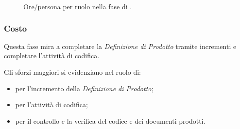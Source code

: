 
\begin{figure}[H]
\caption{Ore/persona per ruolo nella fase di \PDC.}
\label{fig:pdc2}

\end{figure}

\pagebreak
\subsubsection{Costo \PDC}
\introcosto{\PDC}
Questa fase mira a completare la \emph{Definizione di Prodotto} tramite incrementi e completare l'attività di codifica.

Gli sforzi maggiori si evidenziano nel ruolo di:
\begin{itemize}
\item {\PJx} per l'incremento della \emph{Definizione di Prodotto};
\item {\PGx} per l'attività di codifica;
\item {\Vx} per il controllo e la verifica del codice e dei documenti prodotti.
\end{itemize}

